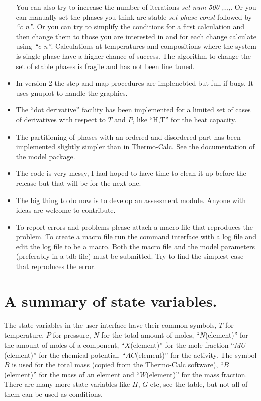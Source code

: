 \documentclass[12pt]{article}
\begin{document}
\begin{itemize}
  You can also try to increase the number of iterations {\em set num
    500 ,,,,}.  Or you can manually set the phases you think are
  stable {\em set phase const} followed by {\em ``c n''}.  Or you can
  try to simplify the conditions for a first calculation and then
  change them to those you are interested in and for each change
  calculate using {\em ``c n''}.  Calculations at temperatures and
  compositions where the system is single phase have a higher chance
  of success.  The algorithm to change the set of stable phases is
  fragile and has not been fine tuned.

\item In version 2 the step and map procedures are implenebted but
  full if bugs.  It uses gnuplot to handle the graphics.  

\item The ``dot derivative'' facility has been implemented for a
  limited set of cases of derivatives with respect to $T$ and $P$,
  like ``H,T'' for the heat capacity.  

\item The partitioning of phases with an ordered and disordered part
  has been implemented slightly simpler than in Thermo-Calc.  See the
  documentation of the model package.

\item The code is very messy, I had hoped to have time to clean it up
  before the release but that will be for the next one.

\item The big thing to do now is to develop an assessment module.
  Anyone with ideas are welcome to contribute.

\item To report errors and problems please attach a macro file that
  reproduces the problem.  To create a macro file run the command
  interface with a log file and edit the log file to be a macro.  Both
  the macro file and the model parameters (preferably in a tdb file)
  must be submitted.  Try to find the simplest case that reproduces
  the error.

\end{itemize}

\section{A summary of state variables.}

The state variables in the user interface have their common symbols,
$T$ for temperature, $P$ for pressure, $N$ for the total amount of
moles, ``$N$(element)'' for the amount of moles of a component,
``$X$(element)'' for the mole fraction ``$MU$(element)'' for the
chemical potential, ``$AC$(element)'' for the activity.  The symbol
$B$ is used for the total mass (copied from the Thermo-Calc software),
``$B$(element)'' for the mass of an element and ``$W$(element)'' for
the mass fraction.  There are many more state variables like $H$, $G$
etc, see the table, but not all of them can be used as conditions.
\end{document}
